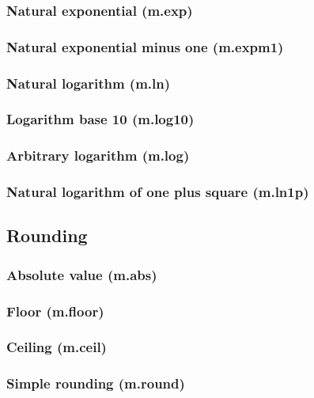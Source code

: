 \documentclass{article}
\theoremstyle{definition}
\begin{document}
\subsubsection{Natural exponential (m.exp)}

\subsubsection{Natural exponential minus one (m.expm1)}

\subsubsection{Natural logarithm (m.ln)}

\subsubsection{Logarithm base 10 (m.log10)}

\subsubsection{Arbitrary logarithm (m.log)}

\subsubsection{Natural logarithm of one plus square (m.ln1p)}

\subsection{Rounding}

\subsubsection{Absolute value (m.abs)}

\subsubsection{Floor (m.floor)}

\subsubsection{Ceiling (m.ceil)}

\subsubsection{Simple rounding (m.round)}
\end{document}
